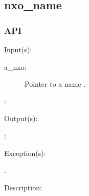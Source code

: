 %
%
%
%
%              

\subsection{nxo\_name}
\label{nxo_name}

\subsubsection{API}
\begin{capi}
\label{nxo_name_}
	\begin{capilist}
	\item[Input(s): ]
		\begin{description}\item[]
		\item[a\_nxo: ]
			Pointer to a name .
		\item[: ]
		\end{description}
	\item[Output(s): ]
		\begin{description}\item[]
		\item[: ]
		\end{description}
	\item[Exception(s): ]
		\begin{description}\item[]
		\item[.]
		\end{description}
	\item[Description: ]
	\end{capilist}
\end{capi}
